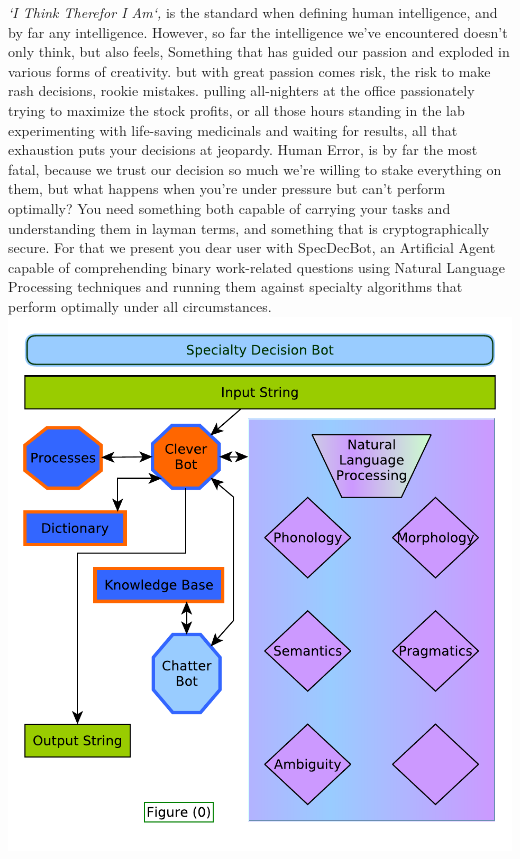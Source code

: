 \documentclass{paper}
\begin{document}
\textit{`I Think Therefor I Am`,} is the standard when defining human intelligence, and by far any intelligence. However, so far the intelligence we've encountered doesn't only think, but also feels, Something that has guided our passion and exploded in various forms of creativity.\newline\newline
but with great passion comes risk, the risk to make rash decisions, rookie mistakes. pulling all-nighters at the office passionately trying to maximize the stock profits, or all those hours standing in the lab experimenting with life-saving medicinals and waiting for results, all that exhaustion puts your decisions at jeopardy.\newline\newline
Human Error, is by far the most fatal, because we trust our decision so much we're willing to stake everything on them, but what happens when you're under pressure but can't perform optimally?
\newline
You need something both capable of carrying your tasks and understanding them in layman terms, and something that is cryptographically secure.\newline\newline
For  that we present you dear user with SpecDecBot, an Artificial Agent capable of comprehending binary work-related questions using Natural Language Processing techniques and running them against specialty algorithms that perform optimally under all circumstances.
\newpage
\includegraphics[]{./SpecDecBot-Diagram0.pdf}
\end{document}
